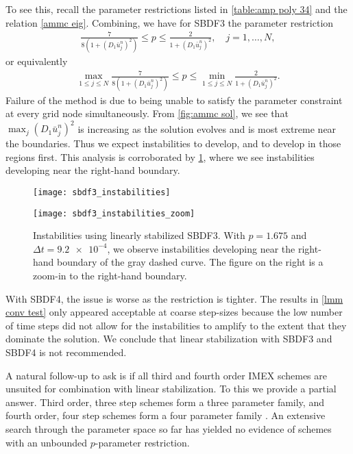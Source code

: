 To see this, recall the parameter restrictions listed in \cref{table:amp poly 34} and the relation \cref{ammc eig}. Combining, we have for SBDF3 the parameter restriction
\begin{align}
        \frac{7}{8(1 + (D_1\bar u^n_j)^2)} \leq p \leq \frac{2}{1 + (D_1 \bar u^n_j)^2},
\quad j=1,\dots,N,
\end{align}
or equivalently
\begin{align} 
\max_{1\leq j\leq N}\frac{7}{8(1 + (D_1\bar u^n_j)^2)} \leq p 
\leq \min_{1\leq j\leq N}\frac{2}{1 + (D_1 \bar u^n_j)^2}.
\end{align}
Failure of the method is due to being unable to satisfy the parameter constraint at every grid node simultaneously. From \cref{fig:ammc sol}, we see that $\max_j (D_1 \bar u^n_j)^2$ is increasing as the solution evolves and is most extreme near the boundaries. Thus we expect instabilities to develop, and to develop in those regions first. This analysis is corroborated by \cref{fig:sbdf3 instab}, where we see instabilities developing near the right-hand boundary.
\begin{figure}[htb!]
        \centering
\begin{minipage}{0.45\textwidth}
       \texttt{[image: sbdf3\_instabilities]}
\end{minipage}
\begin{minipage}{0.45\textwidth}
       \texttt{[image: sbdf3\_instabilities\_zoom]}
\end{minipage}
\caption[Instabilities using linearly stabilized SBDF3]{Instabilities using linearly stabilized SBDF3. With $p=1.675$ and $\Delta t=\num{9.2e-4}$, we observe instabilities developing near the right-hand boundary of the gray dashed curve. The figure on the right is a zoom-in to the right-hand boundary.}
\label{fig:sbdf3 instab}
\end{figure}

With SBDF4, the issue is worse as the restriction is tighter. The results in \cref{lmm conv test} only appeared acceptable at coarse step-sizes because the low number of time steps did not allow for the instabilities to amplify to the extent that they dominate the solution. We conclude that linear stabilization with SBDF3 and SBDF4  is not recommended. 

A natural follow-up to ask is if all third and fourth order IMEX schemes are unsuited for combination with linear stabilization. To this we provide a partial answer. Third order, three step schemes form a three parameter family, and fourth order, four step schemes form a four parameter family \cite{ascher1995implicit}. An extensive search through the parameter space so far has yielded no evidence of schemes with an unbounded $p$-parameter restriction.

